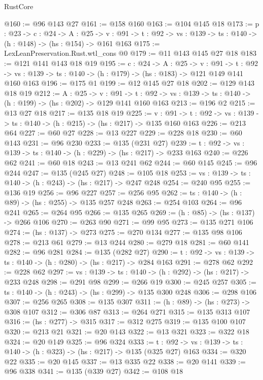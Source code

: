 \begin{lexlean}{RustCore}
\begin{coremodule}
@160 := @96 @143 @27
@161 := @158 @160
@163 := @104 @145 @18
@173 := {p : @23} ->
  {c : @24} ->
  {A : @25} ->
  {v : @91} -> {t : @92} -> {vs : @139} -> {ts : @140} -> (h : @148) -> (hs : @154) -> @161 @163
@175 := LexLeanPreservation.Rust.wtl_cons @0
@179 := @11 @143 @145 @27 @18
@183 := @121 @141 @143 @18 @19
@195 := {c : @24} ->
  {A : @25} ->
  {v : @91} ->
  {t : @92} -> {vs : @139} -> {ts : @140} -> (h : @179) -> (hs : @183) -> @121 @149 @141 @160 @163
@196 := @175 @1
@199 := @12 @145 @27 @18
@202 := @129 @143 @18 @19
@212 := {A : @25} ->
  {v : @91} ->
  {t : @92} -> {vs : @139} -> {ts : @140} -> (h : @199) -> (hs : @202) -> @129 @141 @160 @163
@213 := @196 @2
@215 := @13 @27 @18
@217 := @135 @18 @19
@225 := {v : @91} ->
  {t : @92} -> {vs : @139} -> {ts : @140} -> (h : @215) -> (hs : @217) -> @135 @160 @163
@226 := @213 @64
@227 := @60 @27
@228 := @13 @227
@229 := @228 @18
@230 := @60 @143
@231 := @96 @230
@233 := @135 (@231 @27)
@239 := {t : @92} -> {vs : @139} -> {ts : @140} -> (h : @229) -> (hs : @217) -> @233 @163
@240 := @226 @62
@241 := @60 @18
@243 := @13 @241 @62
@244 := @60 @145
@245 := @96 @244
@247 := @135 (@245 @27)
@248 := @105 @18
@253 := {vs : @139} -> {ts : @140} -> (h : @243) -> (hs : @217) -> @247 @248
@254 := @240 @95
@255 := @136 @19
@256 := @96 @227
@257 := @256 @95
@262 := {ts : @140} -> (h : @89) -> (hs : @255) -> @135 @257 @248
@263 := @254 @103
@264 := @96 @241
@265 := @264 @95
@266 := @135 @265
@269 := (h : @85) -> (hs : @137) -> @266 @106
@270 := @263 @90
@271 := @99 @95
@273 := @135 @271 @106
@274 := (hs : @137) -> @273
@275 := @270 @134
@277 := @135 @98 @106
@278 := @213 @61
@279 := @13 @244
@280 := @279 @18
@281 := @60 @141
@282 := @96 @281
@284 := @135 (@282 @27)
@290 := {t : @92} -> {vs : @139} -> {ts : @140} -> (h : @280) -> (hs : @217) -> @284 @163
@291 := @278 @62
@292 := @228 @62
@297 := {vs : @139} -> {ts : @140} -> (h : @292) -> (hs : @217) -> @233 @248
@298 := @291 @98
@299 := @266 @19
@300 := @245 @257
@305 := {ts : @140} -> (h : @243) -> (hs : @299) -> @135 @300 @248
@306 := @298 @106
@307 := @256 @265
@308 := @135 @307
@311 := (h : @89) -> (hs : @273) -> @308 @107
@312 := @306 @87
@313 := @264 @271
@315 := @135 @313 @107
@316 := (hs : @277) -> @315
@317 := @312 @275
@319 := @135 @100 @107
@320 := @213 @21
@321 := @20 @143
@322 := @13 @321
@323 := @322 @18
@324 := @20 @149
@325 := @96 @324
@333 := {t : @92} -> {vs : @139} -> {ts : @140} -> (h : @323) -> (hs : @217) -> @135 (@325 @27) @163
@334 := @320 @22
@335 := @20 @145
@337 := @13 @335 @22
@338 := @20 @141
@339 := @96 @338
@341 := @135 (@339 @27)
@342 := @108 @18

\end{coremodule}
\end{lexlean}
